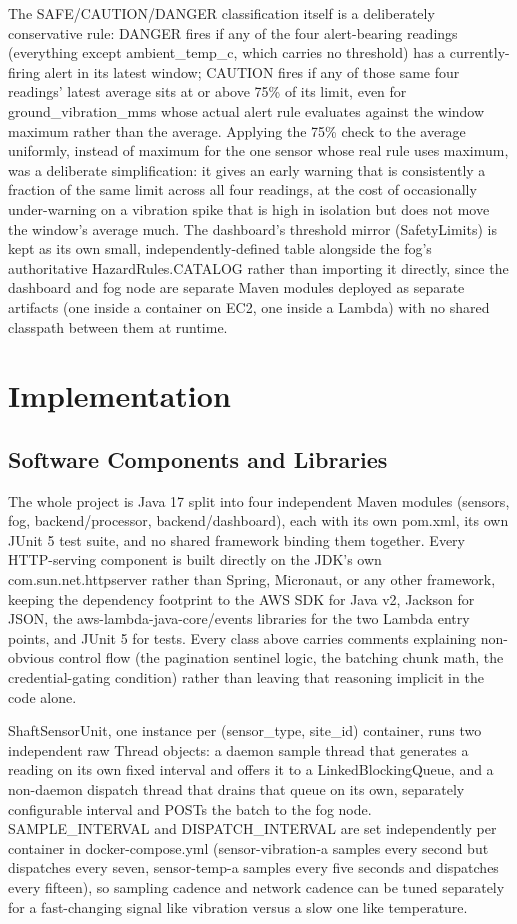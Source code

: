 \documentclass[conference]{IEEEtran}
\begin{document}
The SAFE/CAUTION/DANGER classification itself is a deliberately conservative rule: DANGER fires if any of the four alert-bearing readings (everything except ambient\_temp\_c, which carries no threshold) has a currently-firing alert in its latest window; CAUTION fires if any of those same four readings' latest average sits at or above 75\% of its limit, even for ground\_vibration\_mms whose actual alert rule evaluates against the window maximum rather than the average. Applying the 75\% check to the average uniformly, instead of maximum for the one sensor whose real rule uses maximum, was a deliberate simplification: it gives an early warning that is consistently a fraction of the same limit across all four readings, at the cost of occasionally under-warning on a vibration spike that is high in isolation but does not move the window's average much. The dashboard's threshold mirror (SafetyLimits) is kept as its own small, independently-defined table alongside the fog's authoritative HazardRules.CATALOG rather than importing it directly, since the dashboard and fog node are separate Maven modules deployed as separate artifacts (one inside a container on EC2, one inside a Lambda) with no shared classpath between them at runtime.

\section{Implementation}

\subsection{Software Components and Libraries}

The whole project is Java 17 split into four independent Maven modules (sensors, fog, backend/processor, backend/dashboard), each with its own pom.xml, its own JUnit 5 test suite, and no shared framework binding them together. Every HTTP-serving component is built directly on the JDK's own com.sun.net.httpserver rather than Spring, Micronaut, or any other framework, keeping the dependency footprint to the AWS SDK for Java v2, Jackson for JSON, the aws-lambda-java-core/events libraries for the two Lambda entry points, and JUnit 5 for tests. Every class above carries comments explaining non-obvious control flow (the pagination sentinel logic, the batching chunk math, the credential-gating condition) rather than leaving that reasoning implicit in the code alone.

ShaftSensorUnit, one instance per (sensor\_type, site\_id) container, runs two independent raw Thread objects: a daemon sample thread that generates a reading on its own fixed interval and offers it to a LinkedBlockingQueue, and a non-daemon dispatch thread that drains that queue on its own, separately configurable interval and POSTs the batch to the fog node. SAMPLE\_INTERVAL and DISPATCH\_INTERVAL are set independently per container in docker-compose.yml (sensor-vibration-a samples every second but dispatches every seven, sensor-temp-a samples every five seconds and dispatches every fifteen), so sampling cadence and network cadence can be tuned separately for a fast-changing signal like vibration versus a slow one like temperature.
\end{document}
